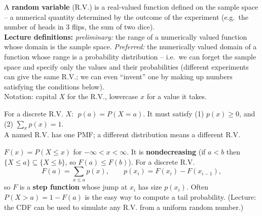 \documentclass[11pt]{article}
\begin{document}
\begin{defbox}
A \textbf{random variable} (R.V.) is a real-valued function defined on the sample space -- a numerical quantity determined by the outcome of the experiment (e.g.\ the number of heads in 3 flips, the sum of two dice).\\[2pt]
\textbf{Lecture definitions:} \emph{preliminary:} the range of a numerically valued function whose domain is the sample space. \emph{Preferred:} the numerically valued domain of a function whose range is a probability distribution -- i.e.\ we can forget the sample space and specify only the values and their probabilities (different experiments can give the same R.V.; we can even ``invent'' one by making up numbers satisfying the conditions below).\\
Notation: capital $X$ for the R.V., lowercase $x$ for a value it takes.
\end{defbox}

\begin{defbox}
For a discrete R.V. $X$: $\;p(a)=P(X=a)$. It must satisfy
(1) $p(x)\ge0$, and (2) $\sum_xp(x)=1$.\\
A named R.V. has one PMF; a different distribution means a different R.V.
\end{defbox}

\begin{defbox}
$F(x)=P(X\le x)$ for $-\infty<x<\infty$. It is \textbf{nondecreasing} (if $a<b$ then $\{X\le a\}\subseteq\{X\le b\}$, so $F(a)\le F(b)$). For a discrete R.V.
\[ F(a)=\sum_{x\le a}p(x),\qquad p(x_i)=F(x_i)-F(x_{i-1}), \]
so $F$ is a \textbf{step function} whose jump at $x_i$ has size $p(x_i)$. Often $P(X>a)=1-F(a)$ is the easy way to compute a tail probability. (Lecture: the CDF can be used to simulate any R.V. from a uniform random number.)
\end{defbox}
\end{document}
